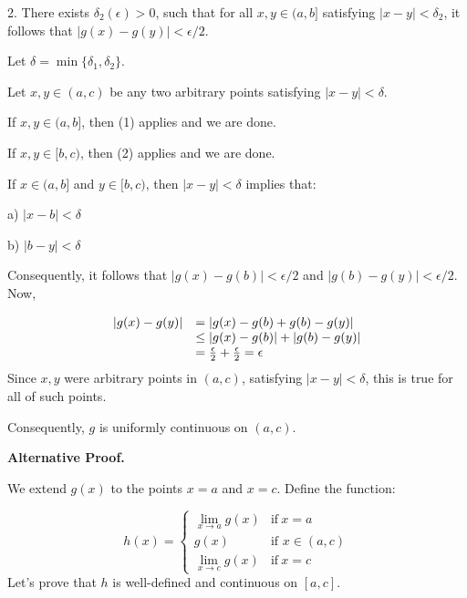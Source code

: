 \documentclass[10pt]{article}
\begin{document}
2. There exists $\displaystyle \delta _{2}( \epsilon )  >0$, such that for all $\displaystyle x,y\in ( a,b]$ satisfying $\displaystyle |x-y|< \delta _{2}$, it follows that $\displaystyle |g( x) -g( y) |< \epsilon /2$.



Let $\displaystyle \delta =\min\{\delta _{1} ,\delta _{2}\}$.

 

Let $\displaystyle x,y\in ( a,c)$ be any two arbitrary points satisfying $\displaystyle |x-y|< \delta $.



If $\displaystyle x,y\in ( a,b]$, then (1) applies and we are done.

If $\displaystyle x,y\in [ b,c)$, then (2) applies and we are done.



If $\displaystyle x\in ( a,b]$ and $\displaystyle y\in [ b,c)$, then $\displaystyle |x-y|< \delta $ implies that:

a) $\displaystyle |x-b|< \delta $

b) $\displaystyle |b-y|< \delta $



Consequently, it follows that $\displaystyle |g( x) -g( b) |< \epsilon /2$ and $\displaystyle |g( b) -g( y) |< \epsilon /2$. Now, 


\begin{equation*}
\begin{array}{ c l }
|g( x) -g( y) | & =|g( x) -g( b) +g( b) -g( y) |\\
 & \leq |g( x) -g( b) |+|g( b) -g( y) |\\
 & =\frac{\epsilon }{2} +\frac{\epsilon }{2} =\epsilon 
\end{array}
\end{equation*}
Since $\displaystyle x,y$ were arbitrary points in $\displaystyle ( a,c)$, satisfying $\displaystyle |x-y|< \delta $, this is true for all of such points. 



Consequently, $\displaystyle g$ is uniformly continuous on $\displaystyle ( a,c)$.



\textbf{Alternative Proof.}



We extend $\displaystyle g( x)$ to the points $\displaystyle x=a$ and $\displaystyle x=c$. Define the function:


\begin{equation*}
h( x) =\begin{cases}
\lim _{x\rightarrow a} g( x) & \text{if} \ x=a\ \\
g( x) & \text{if } x\in ( a,c)\\
\lim _{x\rightarrow c} g( x) & \text{if} \ x=c
\end{cases}
\end{equation*}
Let's prove that $\displaystyle h$ is well-defined and continuous on $\displaystyle [ a,c]$.
\end{document}

